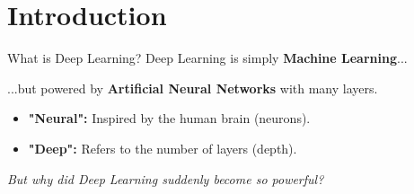 \section{Introduction}
\begin{frame}{What is Deep Learning?}
    \centering
    \Large
    Deep Learning is simply \textbf{Machine Learning}...
    
    \vspace{0.5em}
    ...but powered by \textbf{Artificial Neural Networks} with many layers.
    
    \vspace{1.5em}
    \normalsize
    \begin{itemize}
        \item \textbf{"Neural":} Inspired by the human brain (neurons).
        \item \textbf{"Deep":} Refers to the number of layers (depth).
    \end{itemize}
    
    \pause
    \vspace{1em}
    \textit{But why did Deep Learning suddenly become so powerful?}
\end{frame}

